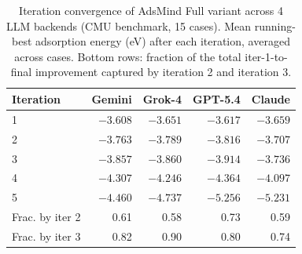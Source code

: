 \begin{table}[h]
\centering
\caption{Iteration convergence of AdsMind Full variant across 4 LLM backends (CMU benchmark, 15 cases). Mean running-best adsorption energy (eV) after each iteration, averaged across cases. Bottom rows: fraction of the total iter-1-to-final improvement captured by iteration 2 and iteration 3.}
\label{tab:si-iteration-convergence}
\begin{tabular}{lrrrr}
\toprule
Iteration & Gemini & Grok-4 & GPT-5.4 & Claude \\
\midrule
  1 & $-3.608$ & $-3.651$ & $-3.617$ & $-3.659$ \\
  2 & $-3.763$ & $-3.789$ & $-3.816$ & $-3.707$ \\
  3 & $-3.857$ & $-3.860$ & $-3.914$ & $-3.736$ \\
  4 & $-4.307$ & $-4.246$ & $-4.364$ & $-4.097$ \\
  5 & $-4.460$ & $-4.737$ & $-5.256$ & $-5.231$ \\
\midrule
  Frac. by iter 2 & 0.61 & 0.58 & 0.73 & 0.59 \\
  Frac. by iter 3 & 0.82 & 0.90 & 0.80 & 0.74 \\
\bottomrule
\end{tabular}
\end{table}
